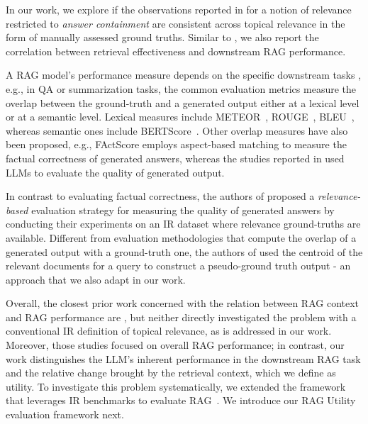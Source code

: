  In our work, we explore if the observations reported in \cite{powerOfNoise,lostInTheMiddle} for a notion of relevance restricted to \textit{answer containment} are consistent across topical relevance in the form of manually assessed ground truths. Similar to \cite{zamani-rag}, we also report the correlation between retrieval effectiveness and downstream RAG performance.


A RAG model's performance measure depends on the specific downstream tasks \cite{surveyLLMEvaluation}, e.g., in QA or summarization tasks, the common evaluation metrics measure the overlap between the ground-truth and a generated output either at a lexical level or at a semantic level. Lexical measures include
METEOR~\cite{metero}, ROUGE~\cite{rouge}, BLEU~\cite{bleuScore}, whereas semantic ones include BERTScore~\cite{finegrainedAnalysisOfBERTScore,bertScore}. Other overlap measures have also been proposed, e.g., FActScore \cite{factScore_EMNLP23} employs aspect-based matching to measure the factual correctness of generated answers, whereas the studies reported in \cite{huang2024empiricalstudyllmasajudgellm,zhuo2024icescoreinstructinglargelanguage} used LLMs to evaluate the quality of generated output.

In contrast to evaluating factual correctness, the authors of \cite{benchmarkOfAnswerEvaluationFromRetriever} proposed a \textit{relevance-based} evaluation strategy for measuring the quality of generated answers by conducting their experiments on an IR dataset where relevance ground-truths are available. Different from evaluation methodologies that compute the overlap of a generated output with a ground-truth one, the authors of \cite{benchmarkOfAnswerEvaluationFromRetriever} used the centroid of the relevant documents for a query to construct a pseudo-ground truth output - an approach that we also adapt in our work.

  Overall, the closest prior work concerned with the relation between RAG context and RAG performance are \cite{powerOfNoise,lostInTheMiddle}, but neither directly investigated the problem with a conventional IR definition of topical relevance, as is addressed in our work. Moreover, those studies focused on overall RAG performance; in contrast, our work distinguishes the LLM's inherent performance in the downstream RAG task and the relative change brought by the retrieval context, which we define as utility. To investigate this problem systematically, we extended the framework that leverages IR benchmarks to evaluate RAG~\cite{benchmarkOfAnswerEvaluationFromRetriever}. We introduce our RAG Utility evaluation framework next.